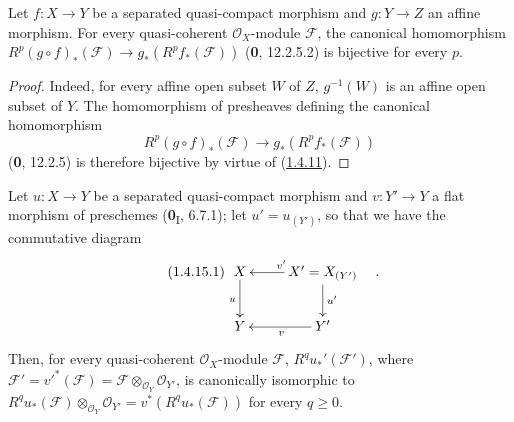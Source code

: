 \begin{proposition}[1.4.14]
\label{III.1.4.14}
Let $f:X\to Y$ be a separated quasi-compact morphism and $g:Y\to Z$ an
affine morphism. For every quasi-coherent $\mathcal O_X$-module
$\mathcal F$, the canonical homomorphism
$R^p(g\circ f)_*(\mathcal F)\to g_*(R^pf_*(\mathcal F))$ \textup{(\textbf{0}, 12.2.5.2)} is
bijective for every $p$.
\end{proposition}

\begin{proof}
Indeed, for every affine open subset $W$ of $Z$, $g^{-1}(W)$ is an affine
open subset of $Y$. The homomorphism of presheaves defining the canonical
homomorphism
\[
R^p(g\circ f)_*(\mathcal F)\longrightarrow g_*(R^pf_*(\mathcal F))
\]
(\textbf{0}, 12.2.5) is therefore bijective by virtue of
(\hyperref[III.1.4.11]{1.4.11}).
\end{proof}

\begin{proposition}[1.4.15]
\label{III.1.4.15}
Let $u:X\to Y$ be a separated quasi-compact morphism and $v:Y'\to Y$ a
flat morphism of preschemes (\textbf{0}\textsubscript{I}, 6.7.1); let
$u'=u_{(Y')}$, so that we have the commutative diagram
\begin{equation}
\label{III.1.4.15.1}
\tag{1.4.15.1}
\xymatrix{
X\ar[d]_u & X'=X_{(Y')}\ar[l]_{v'}\ar[d]^{u'}\\
Y & Y'\ar[l]^v
}\quad.
\end{equation}
Then, for every quasi-coherent $\mathcal O_X$-module $\mathcal F$,
$R^qu_*'(\mathcal F')$, where
$\mathcal F'=v'^*(\mathcal F)=\mathcal F\otimes_{\mathcal O_Y}\mathcal O_{Y'}$,
is canonically isomorphic to
$R^qu_*(\mathcal F)\otimes_{\mathcal O_Y}\mathcal O_{Y'}
=v^*(R^qu_*(\mathcal F))$ for every $q\geq0$.
\end{proposition}

